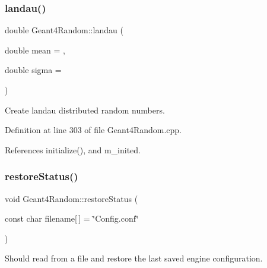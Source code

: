 \hypertarget{class_d_d4hep_1_1_simulation_1_1_geant4_random_a44860eb96afcbda002a7845e8319eb4f}{}\label{class_d_d4hep_1_1_simulation_1_1_geant4_random_a44860eb96afcbda002a7845e8319eb4f} 
\subsubsection{\texorpdfstring{landau()}{landau()}}
{\footnotesize\ttfamily double Geant4\+Random\+::landau (\begin{DoxyParamCaption}\item[{double}]{mean = {},  }\item[{double}]{sigma = {} }\end{DoxyParamCaption})}



Create landau distributed random numbers. 



Definition at line 303 of file Geant4\+Random.\+cpp.



References initialize(), and m\+\_\+inited.

\hypertarget{class_d_d4hep_1_1_simulation_1_1_geant4_random_aad43065d6a4213d3ac0f3d9d024ce5ff}{}\label{class_d_d4hep_1_1_simulation_1_1_geant4_random_aad43065d6a4213d3ac0f3d9d024ce5ff} 
\subsubsection{\texorpdfstring{restore\+Status()}{restoreStatus()}}
{\footnotesize\ttfamily void Geant4\+Random\+::restore\+Status (\begin{DoxyParamCaption}\item[{const char}]{filename\mbox{[}$\,$\mbox{]} = {\ttfamily \char`\"{}Config.conf\char`\"{}} }\end{DoxyParamCaption})\hspace{0.3cm}{\ttfamily [virtual]}}



Should read from a file and restore the last saved engine configuration. 



